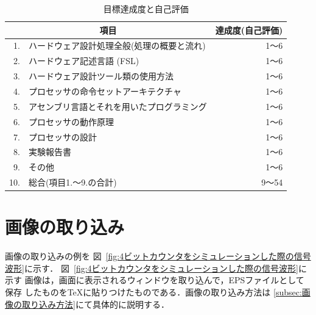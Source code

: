 \documentclass{jarticle}[11pt]
\begin{document}
%

\begin{table}[tb]
\caption{目標達成度と自己評価}
\label{tab:目標達成度と自己評価}
\begin{center}
{\small
\begin{tabular}{rl|r}
\hline
\hline
\multicolumn{2}{c|}{項目} & \multicolumn{1}{c}{達成度(自己評価)} \\
\hline
1. & ハードウェア設計処理全般(処理の概要と流れ) & 1〜6 \\
2. & ハードウェア記述言語 (FSL) & 1〜6 \\
3. & ハードウェア設計ツール類の使用方法 & 1〜6 \\
4. & プロセッサの命令セットアーキテクチャ & 1〜6 \\
5. & アセンブリ言語とそれを用いたプログラミング & 1〜6 \\
6. & プロセッサの動作原理 & 1〜6 \\
7. & プロセッサの設計 & 1〜6 \\
8. & 実験報告書 & 1〜6 \\
9. & その他 & 1〜6 \\
\hline
10. & 総合(項目1.〜9.の合計) & 9〜54 \\
\hline
\end{tabular}
}
\end{center}
\end{table}


\section{画像の取り込み}
画像の取り込みの例を
図~\ref{fig:4ビットカウンタをシミュレーションした際の信号波形}に示す．
図~\ref{fig:4ビットカウンタをシミュレーションした際の信号波形}に示す
画像は，画面に表示されるウィンドウを取り込んで，EPSファイルとして保存
したものをTeXに貼りつけたものである．画像の取り込み方法は
\ref{subsec:画像の取り込み方法}にて具体的に説明する．
\end{document}
